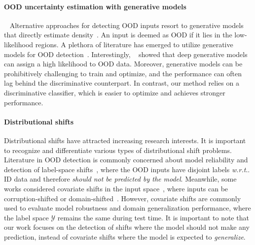 \documentclass{article}
\makeatletter
\DeclareRobustCommand\onedot{\futurelet\@let@token\@onedot}
\def\@onedot{\ifx\@let@token.\else.\null\fi\xspace}
\def\wrt{\emph{w.r.t}\onedot} \def\dof{d.o.f\onedot}
\makeatother
\begin{document}
\paragraph{OOD uncertainty estimation with generative models} ~ Alternative approaches for detecting OOD inputs resort to generative models that directly estimate density~\cite{dinh2017density,huang2017stacked, kingma2014autoencoding, oord2016conditional, rezende2014stochastic,  tabak2013family}. An input is deemed as OOD if it lies in the low-likelihood regions. A plethora of literature has emerged to utilize generative models for OOD detection~\cite{ kirichenko2020normalizing, ren2019likelihood, schirrmeister2020understanding, serra2019input, wang2020further, winkens2020contrastive, xiao2020likelihood}.
Interestingly, \citeauthor{nalisnick2018deep}~\cite{nalisnick2018deep} showed that deep generative models can assign a high likelihood to OOD data.
Moreover, generative models can be prohibitively challenging to train and optimize, and the performance can often lag behind the discriminative counterpart. In contrast, our method relies on a discriminative classifier, which is easier to optimize and achieves stronger performance. 






\vspace{-0.2cm}
\paragraph{Distributional shifts} Distributional shifts have attracted increasing research interests. It is important to recognize and differentiate various types of distributional shift problems. Literature in OOD detection is commonly concerned about model reliability and detection of label-space shifts~\cite{hendrycks2016baseline, liang2018enhancing, liu2020energy}, where the OOD inputs have disjoint labels \wrt ID data and therefore \emph{should not be predicted by the model}. Meanwhile, some works considered covariate shifts in the input space~\citep{hendrycks2019benchmarking, malinin2021shifts, ovadia2019can}, where inputs can be corruption-shifted or domain-shifted~\citep{hsu2020generalized}. However, covariate shifts are commonly used to evaluate model robustness and domain generalization performance, where the label space $\mathcal{Y}$ remains the same during test time. It is important to note that our work focuses on the detection of shifts where the model should not make any prediction, instead of covariate shifts where the model is expected to \emph{generalize}. 
\end{document}
